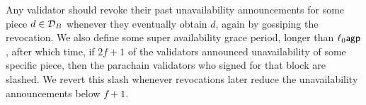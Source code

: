 Any validator should revoke their past unavailability announcements for some piece $d \in \mathcal{D}_B$ whenever they eventually obtain $d$, again by gossiping the revocation.  We also define some super availability grace period, longer than $\ell_0 \mathsf{agp}$, after which time, if $2f+1$ of the validators announced unavailability of some specific piece, then the parachain validators who signed for that block are slashed.
We revert this slash whenever revocations later reduce the unavailability announcements below $f+1$.


